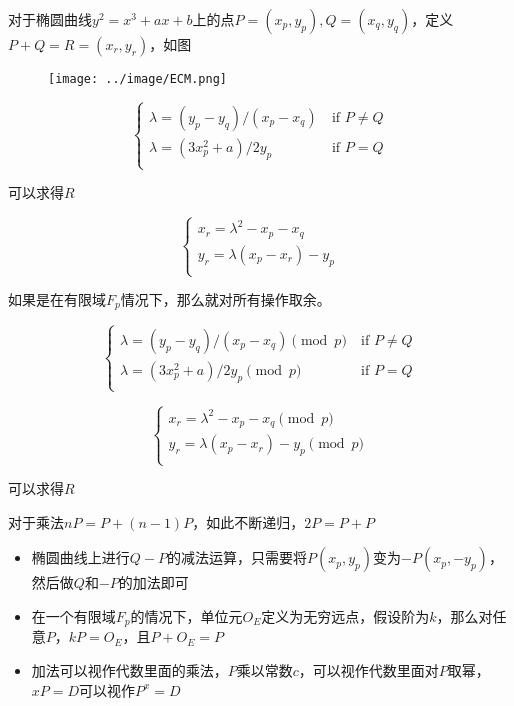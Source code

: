 \documentclass{article}
\begin{document}
对于椭圆曲线$y^2=x^3+ax+b$上的点$P=(x_p,y_p),Q=(x_q,y_q)$，定义$P+Q=R=(x_r,y_r)$，如图

\begin{figure}[h]
    \centering
    \texttt{[image: ../image/ECM.png]}
\end{figure}


\begin{equation}
\begin{cases}
    \lambda = (y_p-y_q)/(x_p-x_q)~&\text{if $P\neq Q$}\\
    \lambda = (3x_p^2+a)/2y_p~&\text{if $P= Q$}\\
\end{cases}
\end{equation}

可以求得$R$

\begin{equation}
\begin{cases}
    x_r=\lambda^2-x_p-x_q\\
    y_r=\lambda(x_p-x_r)-y_p\\
\end{cases}
\end{equation}

如果是在有限域$F_p$情况下，那么就对所有操作取余。

\begin{equation}
    \begin{cases}
        \lambda = (y_p-y_q)/(x_p-x_q) \pmod{p}~ & \text{if $P\neq Q$}     \\
        \lambda = (3x_p^2+a)/2y_p\pmod{p}~   & \text{if $P=Q$} \\
    \end{cases}
\end{equation}

\begin{equation}
    \begin{cases}
        x_r=\lambda^2-x_p-x_q\pmod{p}    \\
        y_r=\lambda(x_p-x_r)-y_p\pmod{p} \\
    \end{cases}
\end{equation}


可以求得$R$

对于乘法$nP=P+(n-1)P$，如此不断递归，$2P=P+P$

\begin{itemize}
    \item 椭圆曲线上进行$Q-P$的减法运算，只需要将$P(x_p,y_p)$变为$-P(x_p,-y_p)$，然后做$Q$和$-P$的加法即可
    \item 在一个有限域$F_p$的情况下，单位元$O_E$定义为无穷远点，假设阶为$k$，那么对任意$P$，$kP=O_E$，且$P+O_E=P$
    \item 加法可以视作代数里面的乘法，$P$乘以常数$c$，可以视作代数里面对$P$取幂，$xP=D$可以视作$P^x= D$
\end{itemize}
\end{document}
